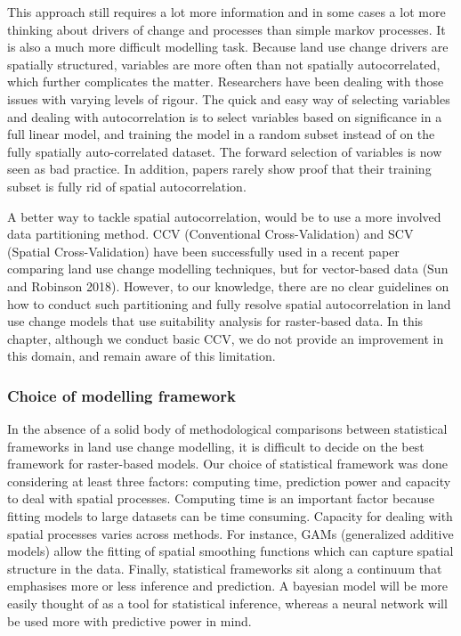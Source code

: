 This approach still requires a lot more information and in some cases a lot more thinking about drivers of change and processes than simple markov processes. It is also a much more difficult modelling task. Because land use change drivers are spatially structured, variables are more often than not spatially autocorrelated, which further complicates the matter. Researchers have been dealing with those issues with varying levels of rigour. The quick and easy way of selecting variables and dealing with autocorrelation is to select variables based on significance in a full linear model, and training the model in a random subset instead of on the fully spatially auto-correlated dataset. The forward selection of variables is now seen as bad practice. In addition, papers rarely show proof that their training subset is fully rid of spatial autocorrelation.

A better way to tackle spatial autocorrelation, would be to use a more involved data partitioning method. CCV (Conventional Cross-Validation) and SCV (Spatial Cross-Validation) have been successfully used in a recent paper comparing land use change modelling techniques, but for vector-based data (Sun and Robinson 2018). However, to our knowledge, there are no clear guidelines on how to conduct such partitioning and fully resolve spatial autocorrelation in land use change models that use suitability analysis for raster-based data. In this chapter, although we conduct basic CCV, we do not provide an improvement in this domain, and remain aware of this limitation.\\

\subsubsection{Choice of modelling framework}

In the absence of a solid body of methodological comparisons between statistical frameworks in land use change modelling, it is difficult to decide on the best framework for raster-based models. Our choice of statistical framework was done considering at least three factors: computing time, prediction power and capacity to deal with spatial processes. Computing time is an important factor because fitting models to large datasets can be time consuming. Capacity for dealing with spatial processes varies across methods. For instance, GAMs (generalized additive models) allow the fitting of spatial smoothing functions which can capture spatial structure in the data. Finally, statistical frameworks sit along a continuum that emphasises more or less inference and prediction. A bayesian model will be more easily thought of as a tool for statistical inference, whereas a neural network will be used more with predictive power in mind.

